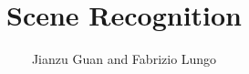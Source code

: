 \documentclass[paper=a4, fontsize=11pt]{article}
\begin{document}
\title{Scene Recognition}
\author{Jianzu Guan and Fabrizio Lungo}
\maketitle
\end{document}
